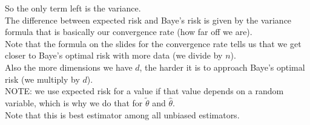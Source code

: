 \documentclass[12pt]{article}
\begin{document}
So the only term left is the variance. \\
The difference between expected risk and
Baye's risk is given by the variance formula
that is basically our convergence rate
(how far off we are). \\

Note that the formula on the slides for the
convergence rate tells us that we get closer
to Baye's optimal risk with more data
(we divide by $n$). \\

Also the more dimensions we have $d$,
the harder it is to approach Baye's optimal 
risk (we multiply by $d$). \\

NOTE: we use expected risk for a value
if that value depends on a random variable,
which is why we do that for $\tilde{\theta}$
and $\hat{\theta}$. \\

Note that this is best estimator among all
unbiased estimators. \\



\newpage
\end{document}
